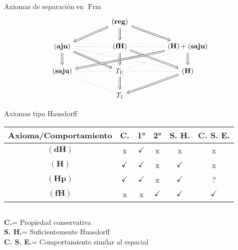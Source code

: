 \documentclass[compress,12pt]{beamer}
\DeclareMathOperator{\Frm}{Frm}
\begin{document}
\begin{frame}{Axiomas de separación en $\Frm$}
    \[\begin{tikzcd}
	&& {\mathbf{(reg)}} \\
	{\mathbf{(aju)}} && {\mathbf{(fH)}} && {\mathbf{(H)}+\mathbf{(saju)}} \\
	{\mathbf{(saju)}} && {T_U} && {\mathbf{(H)}} \\
	&& {T_1}
	\arrow[Rightarrow, from=1-3, to=2-1]
	\arrow[Rightarrow, from=1-3, to=2-3]
	\arrow[Rightarrow, from=1-3, to=2-5]
	\arrow[dotted, no head, from=2-1, to=2-3]
	\arrow[Rightarrow, from=2-1, to=3-1]
	\arrow[Rightarrow, from=2-1, to=3-3]
	\arrow[dotted, no head, from=2-1, to=3-5]
	\arrow[dotted, no head, from=2-3, to=2-5]
	\arrow[dotted, no head, from=2-3, to=3-1]
	\arrow[Rightarrow, from=2-3, to=3-3]
	\arrow[Rightarrow, from=2-3, to=3-5]
	\arrow[Rightarrow, from=2-5, to=3-1]
	\arrow[dotted, no head, from=2-5, to=3-3]
	\arrow[Rightarrow, from=2-5, to=3-5]
	\arrow[dotted, no head, from=3-1, to=3-3]
	\arrow[dotted, no head, from=3-1, to=4-3]
	\arrow[dotted, no head, from=3-3, to=3-5]
	\arrow[Rightarrow, from=3-3, to=4-3]
	\arrow[Rightarrow, from=3-5, to=4-3]
\end{tikzcd}\]
\end{frame}

\begin{frame}{Axiomas tipo Hausdorff}
\begin{center}
\begin{tabular}{| c | c | c | c | c | c |}
\hline
 Axioma/Comportamiento & \textbf{C.} & 1° & 2° & \textbf{S. H.} & \textbf{C. S. E.}\\ \hline
$\mathbf{(dH)}$ & x & $\checkmark$ & x & x & x \\ \hline
$\mathbf{(H)}$ & $\checkmark$ & $\checkmark$ & x & $\checkmark$ & x \\ \hline
$\mathbf{(Hp)}$ & $\checkmark$ & $\checkmark$ & x & $\checkmark$ & ? \\ \hline
$\mathbf{(fH)}$ & x & x &  $\checkmark$ & $\checkmark$ & $\checkmark$ \\ \hline
\end{tabular}
\end{center}
\begin{tiny}
$$\mbox{ }$$
\end{tiny}

\textbf{C.}= Propiedad conservativa\\
\textbf{S. H.}= Suficientemente Huasdorff\\
\textbf{C. S. E.}= Comportamiento similar al espacial

\end{frame}
\end{document}
